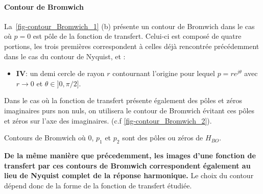\paragraph{Contour de Bromwich}
La~\cref{fig-contour_Bromwich_1} (b) présente un contour de Bromwich dans le 
cas où $p=0$ est pôle de la fonction de transfert. Celui-ci est composé de 
quatre portions, les trois premières correspondent à celles déjà 
rencontrée précédemment dans le cas du contour de Nyquist, et :
\begin{itemize}
    \item \textbf{IV}:  un demi cercle de rayon $r$ contournant l'origine 
          pour lequel $p=re^{j\theta}$ avec $r\rightarrow0$ et 
          $\theta\in]0,\pi/2]$.
\end{itemize}
Dans le cas où la fonction de transfert présente également 
des pôles et zéros imaginaires purs non nuls, on utilisera le contour 
de Bromwich évitant ces pôles et zéros sur l'axe des imaginaires. 
(c.f \cref{fig-contour_Bromwich_2}).
\begin{marginfigure}
    \centering
    
    \caption{Contours de Bromwich où 0, $p_1$ et $p_2$ sont des pôles
             ou zéros de $H_{BO}$.\label{fig-contour_Bromwich_2}} 
\end{marginfigure}
\textbf{De la même manière que précedemment, les images d'une fonction de 
transfert par ces contours de Bromwich correspondent également au lieu de 
Nyquist complet de la réponse harmonique.}
Le choix du contour dépend donc de la forme de la fonction de transfert 
étudiée. 
\clearpage
\restoregeometry
\captionsetup{width=0.9\linewidth}
